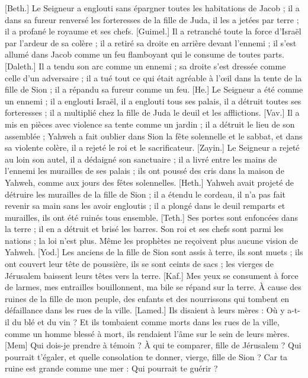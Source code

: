 \begin{multicols}{2}
[Beth.] Le Seigneur a englouti sans épargner toutes les habitations de Jacob ; il a dans sa fureur renversé les forteresses de la fille de Juda, il les a jetées par terre ; il a profané le royaume et ses chefs.
[Guimel.] Il a retranché toute la force d'Israël par l'ardeur de sa colère ; il a retiré sa droite en arrière devant l'ennemi ; il s'est allumé dans Jacob comme un feu flamboyant qui le consume de toutes parts.
[Daleth.] Il a tendu son arc comme un ennemi ; sa droite s'est dressée comme celle d'un adversaire ; il a tué tout ce qui était agréable à l'œil dans la tente de la fille de Sion ; il a répandu sa fureur comme un feu.
[He.] Le Seigneur a été comme un ennemi ; il a englouti Israël, il a englouti tous ses palais, il a détruit toutes ses forteresses ; il a multiplié chez la fille de Juda le deuil et les afflictions.
[Vav.] Il a mis en pièces avec violence sa tente comme un jardin ; il a détruit le lieu de son assemblée ; Yahweh a fait oublier dans Sion la fête solennelle et le sabbat, et dans sa violente colère, il a rejeté le roi et le sacrificateur.
[Zayin.] Le Seigneur a rejeté au loin son autel, il a dédaigné son sanctuaire ; il a livré entre les mains de l'ennemi les murailles de ses palais ; ils ont poussé des cris dans la maison de Yahweh, comme aux jours des fêtes solennelles.
[Heth.] Yahweh avait projeté de détruire les murailles de la fille de Sion ; il a étendu le cordeau, il n'a pas fait revenir sa main sans les avoir engloutis ; il a plongé dans le deuil remparts et murailles, ils ont été ruinés tous ensemble.
[Teth.] Ses portes sont enfoncées dans la terre ; il en a détruit et brisé les barres. Son roi et ses chefs sont parmi les nations ; la loi n'est plus. Même les prophètes ne reçoivent plus aucune vision de Yahweh.
[Yod.] Les anciens de la fille de Sion sont assis à terre, ils sont muets ; ils ont couvert leur tête de poussière, ils se sont ceints de sacs ; les vierges de Jérusalem baissent leurs têtes vers la terre.
[Kaf.] Mes yeux se consument à force de larmes, mes entrailles bouillonnent, ma bile se répand sur la terre. À cause des ruines de la fille de mon peuple, des enfants et des nourrissons qui tombent en défaillance dans les rues de la ville.
[Lamed.] Ils disaient à leurs mères : Où y a-t-il du blé et du vin ? Et ils tombaient comme morts dans les rues de la ville, comme un homme blessé à mort, ils rendaient l'âme sur le sein de leurs mères.
[Mem] Qui dois-je prendre à témoin ? À qui te comparer, fille de Jérusalem ? Qui pourrait t'égaler, et quelle consolation te donner, vierge, fille de Sion ? Car ta ruine est grande comme une mer : Qui pourrait te guérir ?

\end{multicols}

